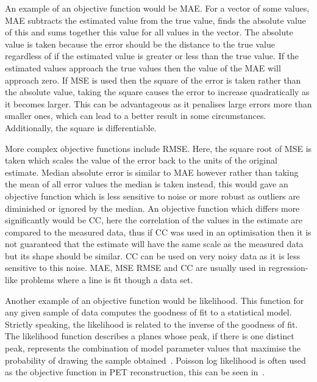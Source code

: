                 An example of an objective function would be \gls{MAE}. For a vector of some values, \gls{MAE} subtracts the estimated value from the true value, finds the absolute value of this and sums together this value for all values in the vector. The absolute value is taken because the error should be the distance to the true value regardless of if the estimated value is greater or less than the true value. If the estimated values approach the true values then the value of the \gls{MAE} will approach zero. If \gls{MSE} is used then the square of the error is taken rather than the absolute value, taking the square causes the error to increase quadratically as it becomes larger. %
                This can be advantageous as it penalises large errors more than smaller ones, which can lead to a better result in some circumstances. Additionally, the square is differentiable.
                
                More complex objective functions include \gls{RMSE}. Here, the square root of \gls{MSE} is taken which scales the value of the error back to the units of the original estimate. Median absolute error is similar to \gls{MAE} however rather than taking the mean of all error values the median is taken instead, this would gave an objective function which is less sensitive to noise or more robust as outliers are diminished or ignored by the median. An objective function which differs more significantly would be \gls{CC}, here the correlation of the values in the estimate are compared to the measured data, thus if \gls{CC} was used in an optimisation then it is not guaranteed that the estimate will have the same scale as the measured data but its shape should be similar. \gls{CC} can be used on very noisy data as it is less sensitive to this noise. \gls{MAE}, \gls{MSE} \gls{RMSE} and \gls{CC} are usually used in regression-like problems where a line is fit though a data set.
                
                Another example of an objective function would be likelihood. This function for any given sample of data computes the goodness of fit to a statistical model. Strictly speaking, the likelihood is related to the inverse of the goodness of fit. 
                The likelihood function describes a planes whose peak, if there is one distinct peak, %
                represents the combination of model parameter values that maximise the probability of drawing the sample obtained~\parencite{Myung2003TutorialEstimation}. %
                Poisson log likelihood is often used as the objective function in \gls{PET} reconstruction, this can be seen in~.
                
